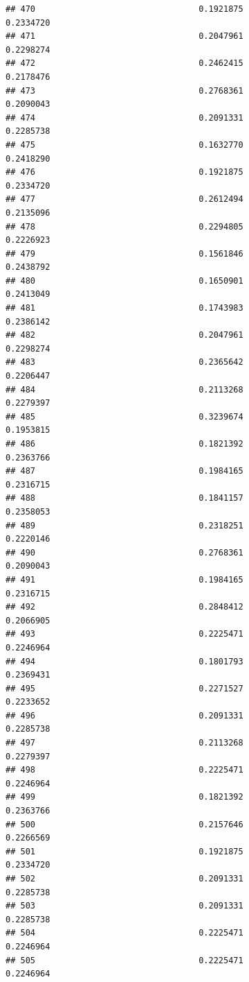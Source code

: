 \documentclass[
  american,
  man,floatsintext]{apa7}
\begin{document}
\begin{verbatim}
## 470                                 0.1921875               0.2334720
## 471                                 0.2047961               0.2298274
## 472                                 0.2462415               0.2178476
## 473                                 0.2768361               0.2090043
## 474                                 0.2091331               0.2285738
## 475                                 0.1632770               0.2418290
## 476                                 0.1921875               0.2334720
## 477                                 0.2612494               0.2135096
## 478                                 0.2294805               0.2226923
## 479                                 0.1561846               0.2438792
## 480                                 0.1650901               0.2413049
## 481                                 0.1743983               0.2386142
## 482                                 0.2047961               0.2298274
## 483                                 0.2365642               0.2206447
## 484                                 0.2113268               0.2279397
## 485                                 0.3239674               0.1953815
## 486                                 0.1821392               0.2363766
## 487                                 0.1984165               0.2316715
## 488                                 0.1841157               0.2358053
## 489                                 0.2318251               0.2220146
## 490                                 0.2768361               0.2090043
## 491                                 0.1984165               0.2316715
## 492                                 0.2848412               0.2066905
## 493                                 0.2225471               0.2246964
## 494                                 0.1801793               0.2369431
## 495                                 0.2271527               0.2233652
## 496                                 0.2091331               0.2285738
## 497                                 0.2113268               0.2279397
## 498                                 0.2225471               0.2246964
## 499                                 0.1821392               0.2363766
## 500                                 0.2157646               0.2266569
## 501                                 0.1921875               0.2334720
## 502                                 0.2091331               0.2285738
## 503                                 0.2091331               0.2285738
## 504                                 0.2225471               0.2246964
## 505                                 0.2225471               0.2246964

\end{verbatim}
\end{document}
